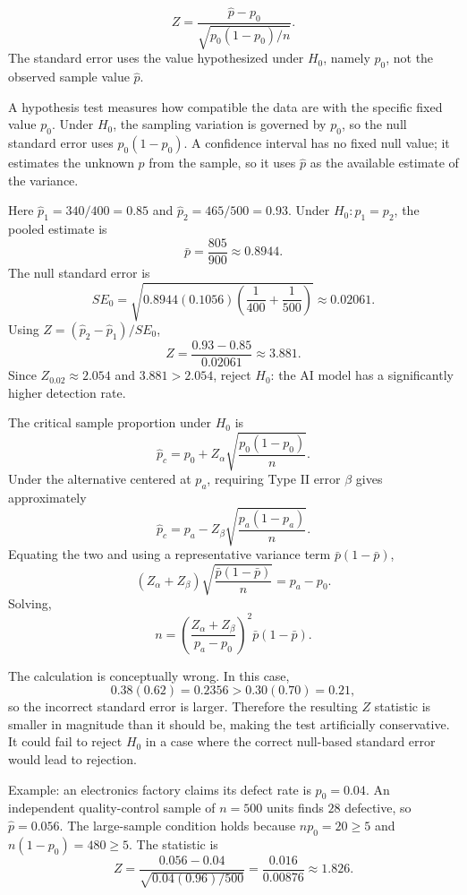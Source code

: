 \begin{solproblema}[prob:9667d45]
\[
	Z=\frac{\hat p-p_0}{\sqrt{p_0(1-p_0)/n}}.
\]
The standard error uses the value hypothesized under $H_0$, namely $p_0$, not the observed sample value $\hat p$.
\end{solproblema}

\begin{solproblema}
A hypothesis test measures how compatible the data are with the specific fixed value $p_0$. Under $H_0$, the sampling variation is governed by $p_0$, so the null standard error uses $p_0(1-p_0)$. A confidence interval has no fixed null value; it estimates the unknown $p$ from the sample, so it uses $\hat p$ as the available estimate of the variance.
\end{solproblema}

\begin{solproblema}[prob:7649a34]
Here $\hat p_1=340/400=0.85$ and $\hat p_2=465/500=0.93$. Under $H_0:p_1=p_2$, the pooled estimate is
\[
	\bar p=\frac{805}{900}\approx0.8944.
\]
The null standard error is
\[
	SE_0=\sqrt{0.8944(0.1056)\left(\frac1{400}+\frac1{500}\right)}
	\approx0.02061.
\]
Using $Z=(\hat p_2-\hat p_1)/SE_0$,
\[
	Z=\frac{0.93-0.85}{0.02061}\approx3.881.
\]
Since $Z_{0.02}\approx2.054$ and $3.881>2.054$, reject $H_0$: the AI model has a significantly higher detection rate.
\end{solproblema}

\begin{solproblema}[prob:451f58f]
The critical sample proportion under $H_0$ is
\[
	\hat p_c=p_0+Z_\alpha\sqrt{\frac{p_0(1-p_0)}n}.
\]
Under the alternative centered at $p_a$, requiring Type II error $\beta$ gives approximately
\[
	\hat p_c=p_a-Z_\beta\sqrt{\frac{p_a(1-p_a)}n}.
\]
Equating the two and using a representative variance term $\bar p(1-\bar p)$,
\[
	(Z_\alpha+Z_\beta)\sqrt{\frac{\bar p(1-\bar p)}n}=p_a-p_0.
\]
Solving,
\[
	n=\left(\frac{Z_\alpha+Z_\beta}{p_a-p_0}\right)^2\bar p(1-\bar p).
\]
\end{solproblema}

\begin{solproblema}[prob:f016371]
The calculation is conceptually wrong. In this case,
\[
	0.38(0.62)=0.2356>0.30(0.70)=0.21,
\]
so the incorrect standard error is larger. Therefore the resulting $Z$ statistic is smaller in magnitude than it should be, making the test artificially conservative. It could fail to reject $H_0$ in a case where the correct null-based standard error would lead to rejection.
\end{solproblema}

\begin{solproblema}[prob:134cb53]
Example: an electronics factory claims its defect rate is $p_0=0.04$. An independent quality-control sample of $n=500$ units finds $28$ defective, so $\hat p=0.056$. The large-sample condition holds because $np_0=20\ge5$ and $n(1-p_0)=480\ge5$. The statistic is
\[
	Z=\frac{0.056-0.04}{\sqrt{0.04(0.96)/500}}
	=\frac{0.016}{0.00876}\approx1.826.
\]
\end{solproblema}
